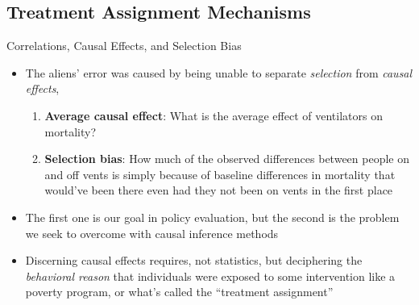 \documentclass{beamer}
\begin{document}
\subsection{Treatment Assignment Mechanisms}






\begin{frame}{Correlations, Causal Effects, and Selection Bias}

\begin{itemize}
\item The aliens' error was caused by being unable to separate \emph{selection} from \emph{causal effects}, 
	\begin{enumerate}
	\item \textbf{Average causal effect}: What is the average effect of ventilators on mortality?
	\item \textbf{Selection bias}: How much of the observed differences between people on and off vents is simply because of baseline differences in mortality that would've been there even had they not been on vents in the first place
	\end{enumerate}
\item The first one is our goal in policy evaluation, but the second is the problem we seek to overcome with causal inference methods
\item Discerning causal effects requires, not statistics, but deciphering the  \emph{behavioral reason} that individuals were exposed to some intervention like a poverty program, or what's called the ``treatment assignment''

\end{itemize}

\end{frame}
\end{document}
